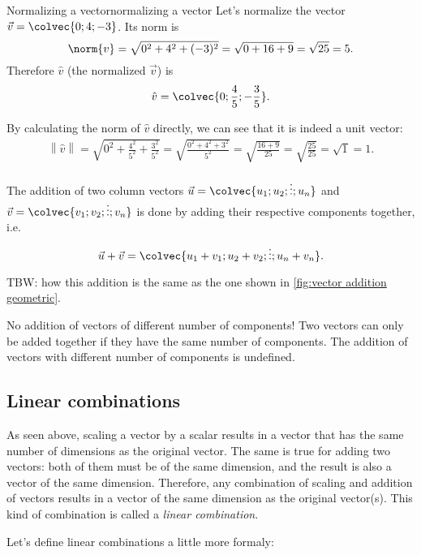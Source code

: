 \begin{example}{Normalizing a vector}{normalizing a vector}
	Let's normalize the vector $\vec{v}=\colvec{0;4;-3}$. Its norm is
	\[
		\norm{v} = \sqrt{0^{2}+4^{2}+(-3)^{2}} = \sqrt{0+16+9} = \sqrt{25} = 5.
	\]
	Therefore $\hat{v}$ (the normalized $\vec{v}$) is
	\[
		\hat{v} = \colvec{0;\frac{4}{5};-\frac{3}{5}}.
	\]

	By calculating the norm of $\hat{v}$ directly, we can see that it is indeed a unit vector:
	\begin{align*}
		\left\|\hat{v}\right\| = \sqrt{0^{2} + \frac{4^{2}}{5^{2}} + \frac{3^{2}}{5^{2}}} = \sqrt{\frac{0^{2}+4^{2}+3^{2}}{5^{2}}} = \sqrt{\frac{16+9}{25}} = \sqrt{\frac{25}{25}} = \sqrt{1} = 1.
	\end{align*}
\end{example}

The addition of two column vectors $\vec{u}=\colvec{u_{1};u_{2};\vdots;u_{n}}$ and $\vec{v}=\colvec{v_{1};v_{2};\vdots;v_{n}}$ is done by adding their respective components together, i.e.
\begin{equation}
	\vec{u} + \vec{v} = \colvec{u_{1}+v_{1};u_{2}+v_{2};\vdots;u_{n}+v_{n}}.
	\label{eq:adding vectors}
\end{equation}

TBW: how this addition is the same as the one shown in \autoref{fig:vector addition geometric}.

\begin{note}{No addition of vectors of different number of components!}{}
	Two vectors can only be added together if they have the same number of components. The addition of vectors with different number of components is undefined.
\end{note}

\subsection{Linear combinations}
As seen above, scaling a vector by a scalar results in a vector that has the same number of dimensions as the original vector. The same is true for adding two vectors: both of them must be of the same dimension, and the result is also a vector of the same dimension. Therefore, any combination of scaling and addition of vectors results in a vector of the same dimension as the original vector(s). This kind of combination is called a \emph{linear combination}.

Let's define linear combinations a little more formaly:

